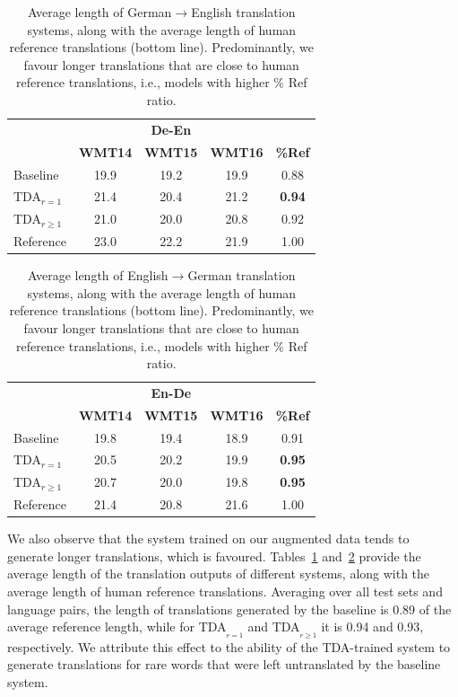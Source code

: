 \begin{table}[htb!]
\centering
\setlength{\tabcolsep}{4pt}
\caption{Average length of German$\rightarrow$English translation systems, along with the average length of human reference translations (bottom line). Predominantly, we favour longer translations that are close to human reference translations, i.e., models with higher \% Ref ratio.\label{sentlen1} }
\begin{tabular}{lcccc}
\toprule
& \multicolumn{3}{c}{ \textbf{De-En}}   \\
\cline{2-4}
\rule{0pt}{2.5ex}     & \bf WMT14 & \bf WMT15 & \bf WMT16 & \bf  \%Ref    \\
 \midrule
Baseline & 19.9 & 19.2 & 19.9 & 0.88  \\
TDA$_{r= 1}$ & 21.4 & 20.4 & 21.2 & \textbf{0.94} \\
TDA$_{r\ge 1}$ & 21.0 & 20.0 & 20.8 & 0.92  \\
\hdashline
Reference & 23.0 & 22.2 & 21.9 & 1.00  \\
\bottomrule
\end{tabular}
\end{table}
\begin{table}[htb!]
\centering
\setlength{\tabcolsep}{4pt}
\caption{Average length of English$\rightarrow$German translation systems, along with the average length of human reference translations (bottom line). Predominantly, we favour longer translations that are close to human reference translations, i.e., models with higher \% Ref ratio.\label{sentlen2} }
\begin{tabular}{lcccc}
\toprule
&  \multicolumn{3}{c}{ \textbf{En-De} }   \\
\cline{2-4} 
\rule{0pt}{2.5ex}     & \bf WMT14 & \bf WMT15 & \bf WMT16 & \bf  \%Ref    \\
 \midrule
Baseline  & 19.8 & 19.4 & 18.9 & 0.91 \\
TDA$_{r= 1}$ &  20.5 & 20.2 & 19.9 & \textbf{0.95} \\
TDA$_{r\ge 1}$  & 20.7 & 20.0 & 19.8 & \textbf{0.95} \\
\hdashline
Reference & 21.4 & 20.8 & 21.6 & 1.00 \\
\bottomrule
\end{tabular}
\end{table}
%
We also observe that the system trained on our augmented data tends to generate longer translations, which is favoured. %
Tables~\ref{sentlen1} and~\ref{sentlen2} provide the average length of the translation outputs of different systems, along with the average length of human reference translations.
Averaging over all test sets and language pairs, the length of translations generated by the baseline is 0.89 of the average reference length, while for TDA\textsubscript{$_{r=1}$} and TDA\textsubscript{$_{r\ge 1}$} it is 0.94 and 0.93, respectively.
We attribute this effect to the ability of the TDA-trained system to generate translations for rare words that were left untranslated by the baseline system.


